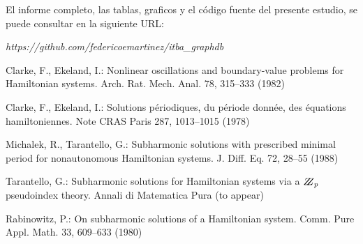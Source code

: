 \documentclass{llncs}
\begin{document}
El informe completo, las tablas, graficos y el código fuente del presente estudio, se puede consultar en la siguiente URL: 

\textit{https://github.com/federicoemartinez/itba\_graphdb}


%
%
\begin{thebibliography}{5}
%
Clarke, F., Ekeland, I.:
Nonlinear oscillations and
boundary-value problems for Hamiltonian systems.
Arch. Rat. Mech. Anal. 78, 315--333 (1982)

Clarke, F., Ekeland, I.:
Solutions p\'{e}riodiques, du
p\'{e}riode donn\'{e}e, des \'{e}quations hamiltoniennes.
Note CRAS Paris 287, 1013--1015 (1978)

Michalek, R., Tarantello, G.:
Subharmonic solutions with prescribed minimal
period for nonautonomous Hamiltonian systems.
J. Diff. Eq. 72, 28--55 (1988)

Tarantello, G.:
Subharmonic solutions for Hamiltonian
systems via a $\bbbz_{p}$ pseudoindex theory.
Annali di Matematica Pura (to appear)

Rabinowitz, P.:
On subharmonic solutions of a Hamiltonian system.
Comm. Pure Appl. Math. 33, 609--633 (1980)

\end{thebibliography}
\end{document}
